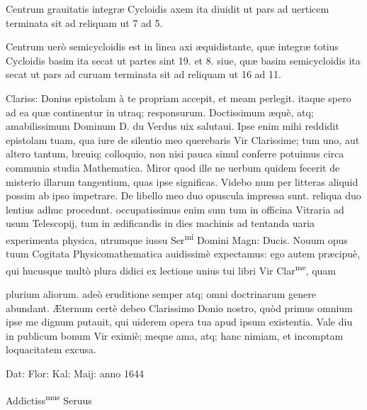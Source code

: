 \documentclass[11pt,a4paper]{article}
\begin{document}

Centrum grauitatis integræ Cycloidis axem ita diuidit ut pars ad uerticem terminata sit ad reliquam ut 7 ad 5.

Centrum uerò semicycloidis est in linea axi æquidistante, quæ integræ totius Cycloidis basim ita secat ut partes sint 19. et 8. siue, quæ basim semicycloidis ita secat ut pars ad curuam terminata sit ad reliquam ut 16 ad 11.

Clariss: Donius epistolam à te propriam accepit, et meam perlegit. itaque spero ad ea quæ continentur in utraq; responsurum. Doctissimum æquè, atq; amabilissimum Dominum D. du Verdus uix salutaui. Ipse enim mihi reddidit epistolam tuam, qua iure de silentio meo querebaris Vir Clarissime; tum uno, aut altero tantum, breuiq; colloquio, non nisi pauca simul conferre potuimus circa communia studia Mathematica. Miror quod ille ne uerbum quidem fecerit de misterio illarum tangentium, quas ipse significas. Videbo num per litteras aliquid possim ab ipso impetrare. De libello meo duo opuscula impressa sunt. reliqua duo lentius adhuc procedunt. occupatissimus enim sum tum in officina Vitraria ad usum Telescopij, tum in ædificandis in dies machinis ad tentanda uaria experimenta physica, utrumque iussu Ser\textsuperscript{mi} Domini Magn: Ducis. Nouum opus tuum Cogitata Physicomathematica auidissimè expectamus: ego autem præcipuè, qui hucusque multò plura didici ex lectione unius tui libri Vir Clar\textsuperscript{me}, quam


plurium aliorum. adeò eruditione semper atq; omni doctrinarum genere abundant. Æternum certè debeo Clarissimo Donio nostro, quòd primus omnium ipse me dignum putauit, qui uiderem opera tua apud ipsum existentia. Vale diu in publicum bonum Vir eximiè; meque ama, atq; hanc nimiam, et incomptam loquacitatem excusa.

Dat: Flor: Kal: Maij: anno 1644

Addictiss\textsuperscript{mus} Seruus
\end{document}
